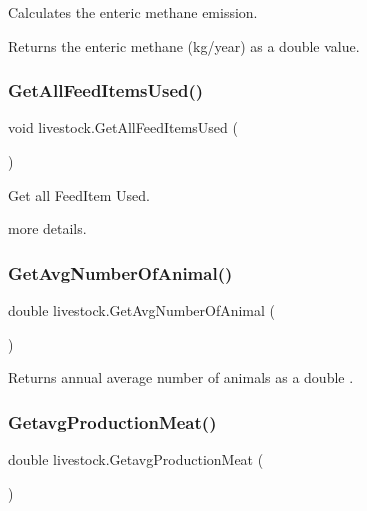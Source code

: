 Calculates the enteric methane emission. 

\begin{DoxyReturn}{Returns}
the enteric methane (kg/year) as a double value. 
\end{DoxyReturn}
\mbox{\label{classlivestock_a4c32851ffda591d69f9c5d6914cb6150}} 
\subsubsection{\texorpdfstring{GetAllFeedItemsUsed()}{GetAllFeedItemsUsed()}}
{\footnotesize\ttfamily void livestock.\+Get\+All\+Feed\+Items\+Used (\begin{DoxyParamCaption}{ }\end{DoxyParamCaption})\hspace{0.3cm}{\ttfamily [inline]}}



Get all Feed\+Item Used. 

more details. \mbox{\label{classlivestock_a00c96a37b8bbcceae2bbc6ecad03103a}} 
\subsubsection{\texorpdfstring{GetAvgNumberOfAnimal()}{GetAvgNumberOfAnimal()}}
{\footnotesize\ttfamily double livestock.\+Get\+Avg\+Number\+Of\+Animal (\begin{DoxyParamCaption}{ }\end{DoxyParamCaption})\hspace{0.3cm}{\ttfamily [inline]}}



Returns annual average number of animals as a double . 

\mbox{\label{classlivestock_a263313014b02fea1070cdaac0b797b06}} 
\subsubsection{\texorpdfstring{GetavgProductionMeat()}{GetavgProductionMeat()}}
{\footnotesize\ttfamily double livestock.\+Getavg\+Production\+Meat (\begin{DoxyParamCaption}{ }\end{DoxyParamCaption})\hspace{0.3cm}{\ttfamily [inline]}}



